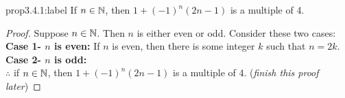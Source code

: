 \begin{proposition}{prop3.4.1:label}
    If $n \in \mathbb{N}$, then $1 + (-1)^n(2n-1)$ is a multiple of 4.
\end{proposition}

\begin{proof}
    Suppose $n \in \mathbb{N}$. Then $n$ is either even or odd. Consider these two cases:\\

    \textbf{Case 1- $n$ is even:} If $n$ is even, then there is some integer  $k$ such that $n = 2k$. \\

    \textbf{Case 2- $n$ is odd:} \\

    $\therefore$ if $n \in \mathbb{N}$, then $1 + (-1)^n(2n-1)$ is a multiple of 4. (\textit{finish this proof later})
\end{proof}

